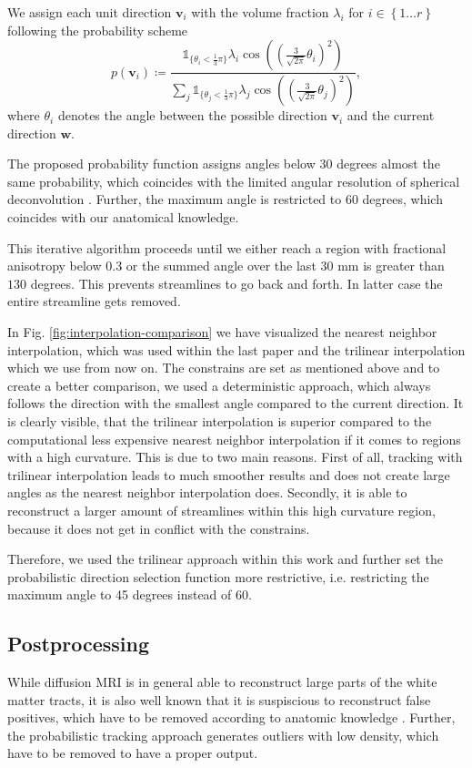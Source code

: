 We assign each unit direction $\mathbf{v}_i$ with the volume fraction
$\lambda_i$ for $i \in \left\{ 1\dots r \right\}$ following the probability
scheme 
\[
	p \left( \mathbf{v}_i \right) \coloneqq \frac{ \mathbb{1}_{\lbrace\theta_i <
		\frac{1}{3} \pi \rbrace} \lambda_i \cos \left( \left( \frac{3}{\sqrt{2
\pi}} \theta_i \right)^2 \right)}{\sum_j \mathbb{1}_{\lbrace\theta_j <
		\frac{1}{3} \pi \rbrace} \lambda_j \cos \left( \left( \frac{3}{\sqrt{2
\pi}} \theta_j \right)^2 \right) }, 
\]
where $\theta_i$ denotes the angle between the possible direction $\mathbf{v}_i$
and the current direction $\mathbf{w}$. 

The proposed probability function assigns angles below 30 degrees almost the
same probability, which coincides with the limited angular resolution of
spherical deconvolution \cite{TOURNIER20071459}. Further, the maximum angle is
restricted to 60 degrees, which coincides with our anatomical knowledge.

This iterative algorithm proceeds until we either reach a region with fractional
anisotropy below $0.3$ or the summed angle over the last $30$ mm is greater than
$130$ degrees. This prevents streamlines to go back and forth. In latter case
the entire streamline gets removed. 

In Fig. \ref{fig:interpolation-comparison} we have visualized the nearest
neighbor interpolation, which was used within the last paper and the trilinear
interpolation which we use from now on. The constrains are set as mentioned
above and to create a better comparison, we used a deterministic approach, which
always follows the direction with the smallest angle compared to the current
direction. It is clearly visible, that the trilinear interpolation is superior
compared to the computational less expensive nearest neighbor interpolation if it comes to
regions with a high curvature. This is due to two main reasons. First of all,
tracking with trilinear interpolation leads to much smoother results and does
not create large angles as the nearest neighbor interpolation does. Secondly,
it is able to reconstruct a larger amount of streamlines within this high
curvature region, because it does not get in conflict with the constrains.

Therefore, we used the trilinear approach within this work and further set the
probabilistic direction selection function more restrictive, i.e. restricting
the maximum angle to 45 degrees instead of 60.  


\subsection{Postprocessing}
While diffusion MRI is in general able to reconstruct large parts of the white
matter tracts, it is also well known that it is suspiscious to reconstruct false
positives, which have to be removed according to anatomic knowledge
\cite{Wakana:2007, MaierHein:2017}. Further, the probabilistic tracking approach
generates outliers with low density, which have to be removed to have a proper
output. 

